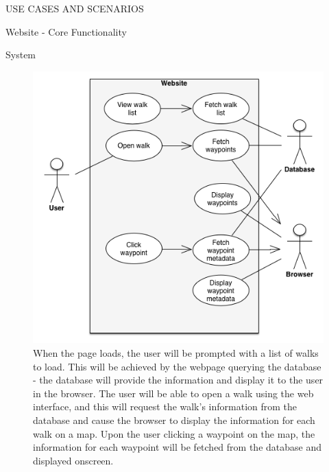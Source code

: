 \documentclass{article}
\begin{document}
\begin{section}{USE CASES AND SCENARIOS}
		\clearpage
		\begin{subsection}{Website - Core Functionality}
			\begin{subsubsection}{System}
				\begin{figure}[h!]
					\begin{center}
						\includegraphics[height=0.75\columnwidth]{../Diagrams/UseCase/Website/Core/Website.png}
					\end{center}
					\caption{When the page loads, the user will be prompted with a list of walks to load. This will be achieved by the webpage querying the database - the database will provide the information and display it to the user in the browser. The user will be able to open a walk using the web interface, and this will request the walk's information from the database and cause the browser to display the information for each walk on a map. Upon the user clicking a waypoint on the map, the information for each waypoint will be fetched from the database and displayed onscreen.}
				\end{figure}
			\end{subsubsection}
		\end{subsection}
		

\end{section}
\end{document}
